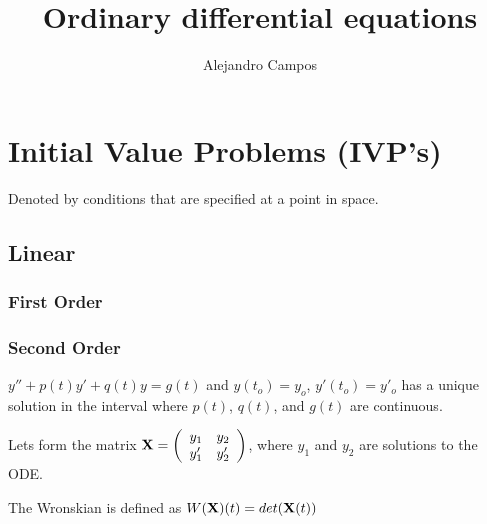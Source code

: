\documentclass[11pt]{article}
\title{Ordinary differential equations}
\author{Alejandro Campos}
\begin{document}
\maketitle
\tableofcontents

\section{Initial Value Problems (IVP's)}
Denoted by conditions that are specified at a point in space.
\subsection{Linear}
	\subsubsection{First Order}
	\subsubsection{Second Order}
		
		$y''+p(t)y'+q(t)y=g(t)$ and $y(t_o)=y_o$, $y'(t_o)=y'_o$ has a unique solution in the interval where $p(t)$, $q(t)$, and $g(t)$ are continuous.
		
		Lets form the matrix $\bold{X}= \left( \begin{array}{cc}
y_1 & y_2 \\
y'_1 & y'_2 \\
 \end{array} \right)$, where $y_1$ and $y_2$ are solutions to the ODE. 
 
 The Wronskian is defined as $W(\bold{X})(t)=det(\bold{X}(t))$
		
\end{document}
